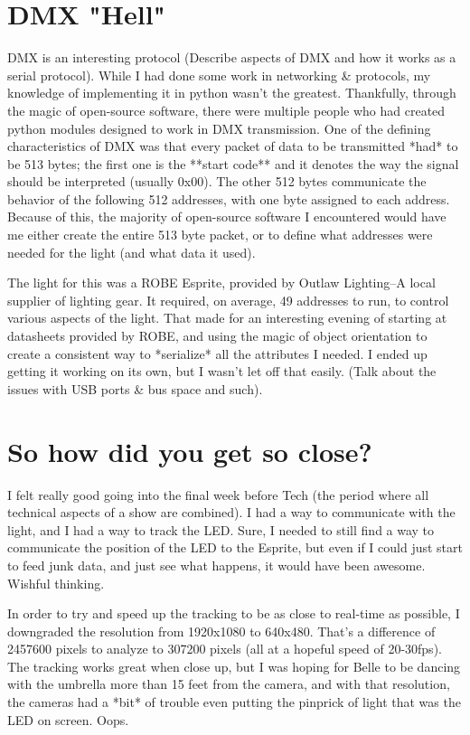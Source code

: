 \documentclass[12pt,twoside]{reedthesis}
\begin{document}
\section{DMX "Hell"}
DMX is an interesting protocol (Describe aspects of DMX and how it works as a serial protocol). While I had done some work in networking \& protocols, my knowledge of implementing it in python wasn't the greatest. Thankfully, through the magic of open-source software, there were multiple people who had created python modules designed to work in DMX transmission. One of the defining characteristics of DMX was that every packet of data to be transmitted *had* to be 513 bytes; the first one is the **start code** and it denotes the way the signal should be interpreted (usually 0x00). The other 512 bytes communicate the behavior of the following 512 addresses, with one byte assigned to each address. Because of this, the majority of open-source software I encountered would have me either create the entire 513 byte packet, or to define what addresses were needed for the light (and what data it used).

The light for this was a ROBE Esprite, provided by Outlaw Lighting--A local supplier of lighting gear. It required, on average, 49 addresses to run, to control various aspects of the light. That made for an interesting evening of starting at datasheets provided by ROBE, and using the magic of object orientation to create a consistent way to *serialize* all the attributes I needed. I ended up getting it working on its own, but I wasn't let off that easily. (Talk about the issues with USB ports \& bus space and such).

\section{So how did you get so close?}

I felt really good going into the final week before Tech (the period where all technical aspects of a show are combined). I had a way to communicate with the light, and I had a way to track the LED. Sure, I needed to still find a way to communicate the position of the LED to the Esprite, but even if I could just start to feed junk data, and just see what happens, it would have been awesome. Wishful thinking.

In order to try and speed up the tracking to be as close to real-time as possible, I downgraded the resolution from 1920x1080 to 640x480. That's a difference of 2457600 pixels to analyze to 307200 pixels (all at a hopeful speed of 20-30fps). The tracking works great when close up, but I was hoping for Belle to be dancing with the umbrella more than 15 feet from the camera, and with that resolution, the cameras had a *bit* of trouble even putting the pinprick of light that was the LED on screen. Oops.
\end{document}
